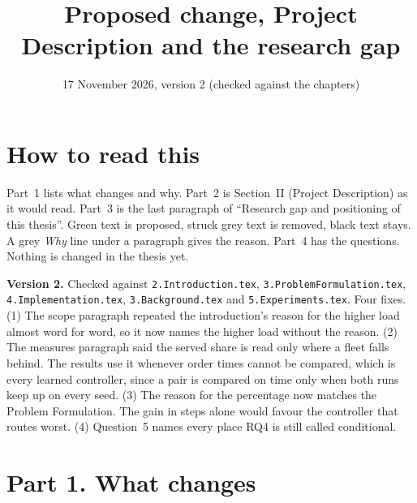 \documentclass[11pt,a4paper]{article}
\title{Proposed change, Project Description and the research gap}
\date{17 November 2026, version 2 (checked against the chapters)}
\begin{document}
\maketitle

\section*{How to read this}
Part~1 lists what changes and why. Part~2 is Section~II (Project Description) as it would read.
Part~3 is the last paragraph of ``Research gap and positioning of this thesis''. Green text is
proposed, struck grey text is removed, black text stays. A grey \emph{Why} line under a paragraph
gives the reason. Part~4 has the questions. Nothing is changed in the thesis yet.

\textbf{Version 2.} Checked against \texttt{2.Introduction.tex}, \texttt{3.ProblemFormulation.tex}, \texttt{4.Implementation.tex}, \texttt{3.Background.tex} and \texttt{5.Experiments.tex}. Four fixes. (1) The scope paragraph repeated the introduction's reason for the higher load almost word for word, so it now names the higher load without the reason. (2) The measures paragraph said the served share is read only where a fleet falls behind. The results use it whenever order times cannot be compared, which is every learned controller, since a pair is compared on time only when both runs keep up on every seed. (3) The reason for the percentage now matches the Problem Formulation. The gain in steps alone would favour the controller that routes worst. (4) Question~5 names every place RQ4 is still called conditional.

\section*{Part 1. What changes}
\end{document}
